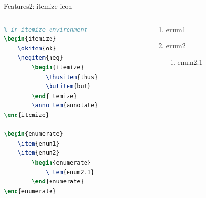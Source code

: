 \documentclass[aspectratio=1610,14pt]{beamer}
\begin{document}
\begin{frame}[fragile]{Features2: itemize icon}
    \begin{columns}
        \begin{column}{0.5\textwidth}
            \begin{lstlisting}[language=TeX]
% using feature command 
% in itemize environment
\begin{itemize}
    \okitem{ok}
    \negitem{neg}
        \begin{itemize}
            \thusitem{thus}
            \butitem{but}
        \end{itemize}
        \annoitem{annotate}
\end{itemize}

\begin{enumerate}
    \item{enum1}
    \item{enum2}
        \begin{enumerate}
            \item{enum2.1}
        \end{enumerate}
\end{enumerate}            
            \end{lstlisting}
        \end{column}
        \begin{column}{0.5\textwidth}
            \begin{itemize}
                    \begin{itemize}
                    \end{itemize}
            \end{itemize}

            \begin{enumerate}
                \item{enum1}
                \item{enum2}
                    \begin{enumerate}
                        \item{enum2.1}
                    \end{enumerate}
            \end{enumerate}
        \vspace{2em}
        \end{column}
    \end{columns}
\end{frame}
\end{document}
